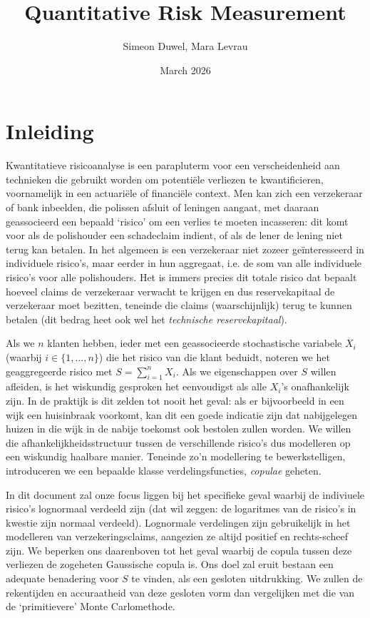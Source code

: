 \documentclass{article}
\title{Quantitative Risk Measurement}
\author{Simeon Duwel, Mara Levrau}
\date{March 2026}
\begin{document}

\newpage
\tableofcontents
\newpage

\section*{Inleiding}
Kwantitatieve risicoanalyse is een parapluterm voor een verscheidenheid aan technieken die gebruikt worden om potentiële verliezen te kwantificieren, voornamelijk in een actuariële of financiële context. Men kan zich een verzekeraar of bank inbeelden, die polissen afsluit of leningen aangaat, met daaraan geassocieerd een bepaald `risico' om een verlies te moeten incasseren: dit komt voor als de polishouder een schadeclaim indient, of als de lener de lening niet terug kan betalen. In het algemeen is een verzekeraar niet zozeer geïnteresseerd in individuele risico's, maar eerder in hun aggregaat, i.e. de som van alle individuele risico's voor alle polishouders. Het is immers precies dit totale risico dat bepaalt hoeveel claims de verzekeraar verwacht te krijgen en dus reservekapitaal de verzekeraar moet bezitten, teneinde die claims (waarschijnlijk) terug te kunnen betalen (dit bedrag heet ook wel het \textit{technische reservekapitaal}).

Als we $n$ klanten hebben, ieder met een geassocieerde stochastische variabele $X_i$ (waarbij \mbox{$i \in \{1, ..., n\}$}) die het risico van die klant beduidt, noteren we het geaggregeerde risico met \mbox{$S = \sum_{i=1}^n X_i$}. Als we eigenschappen over $S$ willen afleiden, is het wiskundig gesproken het eenvoudigst als alle $X_i$'s onafhankelijk zijn. In de praktijk is dit zelden tot nooit het geval: als er bijvoorbeeld in een wijk een huisinbraak voorkomt, kan dit een goede indicatie zijn dat nabijgelegen huizen in die wijk in de nabije toekomst ook bestolen zullen worden. We willen die afhankelijkheidsstructuur tussen de verschillende risico's dus modelleren op een wiskundig haalbare manier. Teneinde zo'n modellering te bewerkstelligen, introduceren we een bepaalde klasse verdelingsfuncties, \textit{copulae} geheten.

In dit document zal onze focus liggen bij het specifieke geval waarbij de indiviuele risico's lognormaal verdeeld zijn (dat wil zeggen: de logaritmes van de risico's in kwestie zijn normaal verdeeld). Lognormale verdelingen zijn gebruikelijk in het modelleren van verzekeringsclaims, aangezien ze altijd positief en rechts-scheef zijn. We beperken ons daarenboven tot het geval waarbij de copula tussen deze verliezen de zogeheten Gaussische copula is. Ons doel zal eruit bestaan een adequate benadering voor $S$ te vinden, als een gesloten uitdrukking. We zullen de rekentijden en accuraatheid van deze gesloten vorm dan vergelijken met die van de `primitievere' Monte Carlomethode.
\end{document}

